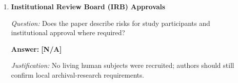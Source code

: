 \begin{enumerate}
\item \textbf{Institutional Review Board (IRB) Approvals}\par\noindent\textit{Question:} Does the paper describe risks for study participants and institutional approval where required?\par\noindent\textbf{Answer:} \textbf{[N/A]}\par\noindent\textit{Justification:} No living human subjects were recruited; authors should still confirm local archival-research requirements.\par
\end{enumerate}
